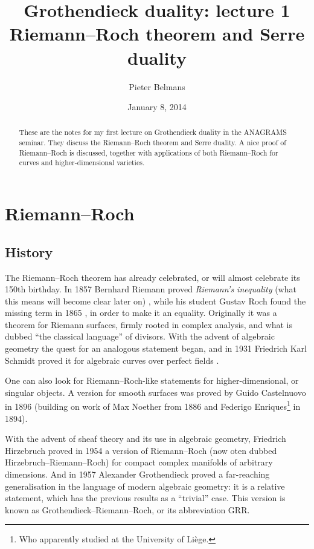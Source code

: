 \documentclass[10pt,a4paper]{article}
\title{Grothendieck duality: lecture 1 \\[.2em] \Large Riemann--Roch theorem and Serre duality}
\author{Pieter Belmans}
\date{January 8, 2014}
\theoremstyle{lecture}
\begin{document}
\maketitle

\begin{abstract}
  These are the notes for my first lecture on Grothendieck duality in the ANAGRAMS seminar. They discuss the Riemann--Roch theorem and Serre duality. A nice proof of Riemann--Roch is discussed, together with applications of both Riemann--Roch for curves and higher-dimensional varieties.
\end{abstract}

\tableofcontents

\clearpage

\section{Riemann--Roch}
\label{section:riemann-roch}
\subsection{History}
\label{subsection:riemann-roch-history}
The Riemann--Roch theorem has already celebrated, or will almost celebrate its 150th birthday. In 1857 Bernhard Riemann proved \emph{Riemann's inequality} (what this means will become clear later on) \cite{riemann-abelschen-funktionen}, while his student Gustav Roch found the missing term in 1865 \cite{roch-ueber-die-anzahl}, in order to make it an equality. Originally it was a theorem for Riemann surfaces, firmly rooted in complex analysis, and what is dubbed ``the classical language'' of divisors. With the advent of algebraic geometry the quest for an analogous statement began, and in 1931 Friedrich Karl Schmidt proved it for algebraic curves over perfect fields \cite{schmidt-zaehlentheorie}.

One can also look for Riemann--Roch-like statements for higher-dimensional, or singular objects. A version for smooth surfaces was proved by Guido Castelnuovo in 1896 (building on work of Max Noether from 1886 and Federigo Enriques\footnote{Who apparently studied at the University of Li\`ege.} in 1894). 

With the advent of sheaf theory and its use in algebraic geometry, Friedrich Hirzebruch proved in 1954 a version of Riemann--Roch (now oten dubbed Hirzebruch--Riemann--Roch) for compact complex manifolds of arbitrary dimensions. And in 1957 Alexander Grothendieck proved a far-reaching generalisation in the language of modern algebraic geometry: it is a relative statement, which has the previous results as a ``trivial'' case. This version is known as Grothendieck--Riemann--Roch, or its abbreviation GRR.
\end{document}
